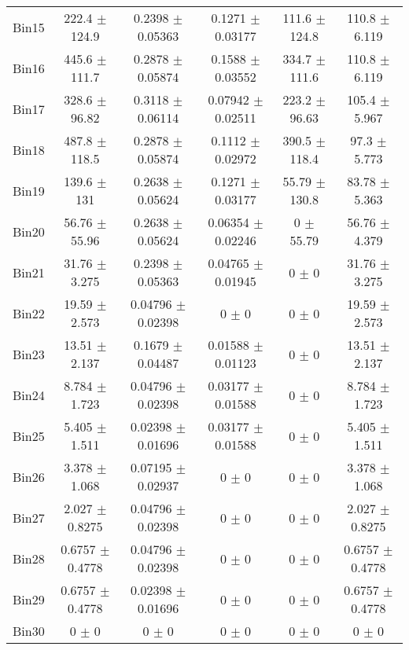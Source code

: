 \begin{tabular}{@{\extracolsep{4pt}}lccccc@{}}
     Bin15 & 222.4 $\pm$ 124.9 & 0.2398 $\pm$ 0.05363 & 0.1271 $\pm$ 0.03177 & 111.6 $\pm$ 124.8 & 110.8 $\pm$ 6.119 \\ 
     Bin16 & 445.6 $\pm$ 111.7 & 0.2878 $\pm$ 0.05874 & 0.1588 $\pm$ 0.03552 & 334.7 $\pm$ 111.6 & 110.8 $\pm$ 6.119 \\ 
     Bin17 & 328.6 $\pm$ 96.82 & 0.3118 $\pm$ 0.06114 & 0.07942 $\pm$ 0.02511 & 223.2 $\pm$ 96.63 & 105.4 $\pm$ 5.967 \\ 
     Bin18 & 487.8 $\pm$ 118.5 & 0.2878 $\pm$ 0.05874 & 0.1112 $\pm$ 0.02972 & 390.5 $\pm$ 118.4 & 97.3 $\pm$ 5.773 \\ 
     Bin19 & 139.6 $\pm$ 131 & 0.2638 $\pm$ 0.05624 & 0.1271 $\pm$ 0.03177 & 55.79 $\pm$ 130.8 & 83.78 $\pm$ 5.363 \\ 
     Bin20 & 56.76 $\pm$ 55.96 & 0.2638 $\pm$ 0.05624 & 0.06354 $\pm$ 0.02246 & 0 $\pm$ 55.79 & 56.76 $\pm$ 4.379 \\ 
     Bin21 & 31.76 $\pm$ 3.275 & 0.2398 $\pm$ 0.05363 & 0.04765 $\pm$ 0.01945 & 0 $\pm$ 0 & 31.76 $\pm$ 3.275 \\ 
     Bin22 & 19.59 $\pm$ 2.573 & 0.04796 $\pm$ 0.02398 & 0 $\pm$ 0 & 0 $\pm$ 0 & 19.59 $\pm$ 2.573 \\ 
     Bin23 & 13.51 $\pm$ 2.137 & 0.1679 $\pm$ 0.04487 & 0.01588 $\pm$ 0.01123 & 0 $\pm$ 0 & 13.51 $\pm$ 2.137 \\ 
     Bin24 & 8.784 $\pm$ 1.723 & 0.04796 $\pm$ 0.02398 & 0.03177 $\pm$ 0.01588 & 0 $\pm$ 0 & 8.784 $\pm$ 1.723 \\ 
     Bin25 & 5.405 $\pm$ 1.511 & 0.02398 $\pm$ 0.01696 & 0.03177 $\pm$ 0.01588 & 0 $\pm$ 0 & 5.405 $\pm$ 1.511 \\ 
     Bin26 & 3.378 $\pm$ 1.068 & 0.07195 $\pm$ 0.02937 & 0 $\pm$ 0 & 0 $\pm$ 0 & 3.378 $\pm$ 1.068 \\ 
     Bin27 & 2.027 $\pm$ 0.8275 & 0.04796 $\pm$ 0.02398 & 0 $\pm$ 0 & 0 $\pm$ 0 & 2.027 $\pm$ 0.8275 \\ 
     Bin28 & 0.6757 $\pm$ 0.4778 & 0.04796 $\pm$ 0.02398 & 0 $\pm$ 0 & 0 $\pm$ 0 & 0.6757 $\pm$ 0.4778 \\ 
     Bin29 & 0.6757 $\pm$ 0.4778 & 0.02398 $\pm$ 0.01696 & 0 $\pm$ 0 & 0 $\pm$ 0 & 0.6757 $\pm$ 0.4778 \\ 
     Bin30 & 0 $\pm$ 0 & 0 $\pm$ 0 & 0 $\pm$ 0 & 0 $\pm$ 0 & 0 $\pm$ 0 \\ 
\hline\hline
  \end{tabular}

